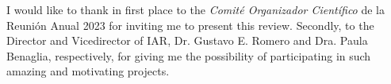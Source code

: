 \documentclass[baaa]{baaa}
\begin{document}
\begin{acknowledgement}
I would like to thank in first place to the \textit{Comité Organizador Científico} de la Reunión Anual 2023 for inviting me to present this review. Secondly, to the Director and Vicedirector of IAR, Dr. Gustavo E. Romero and Dra. Paula Benaglia, respectively, for giving me the possibility of participating in such amazing and motivating projects.
\end{acknowledgement}




\small

 
\end{document}
